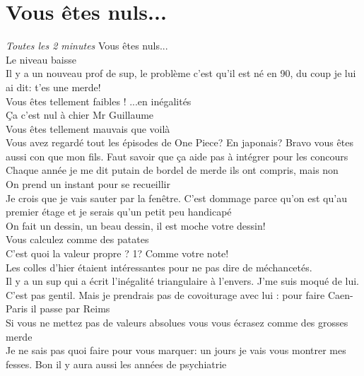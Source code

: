 \documentclass[french, a4paper, openany]{book}
\begin{document}
 \maketitle

\tableofcontents

\section{Vous êtes nuls...}
	
	\noindent \emph{Toutes les 2 minutes} \og Vous êtes nuls... \fg \\
	\og Le niveau baisse \fg \\
	\og Il y a un nouveau prof de sup, le problème c'est qu'il est né en 90, du coup je lui ai dit: t'es une merde! \fg \\
	\og Vous êtes tellement faibles ! ...en inégalités \fg \\
	\og Ça c'est nul à chier Mr Guillaume \fg \\
	\og Vous êtes tellement mauvais que voilà \fg \\
	\og Vous avez regardé tout les épisodes de One Piece? En japonais? Bravo vous êtes aussi con que mon fils. Faut savoir que ça aide pas à intégrer pour les concours \fg \\
	\og Chaque année je me dit \fg putain de bordel de merde ils ont compris\og , mais non \fg \\
	\og On prend un instant pour se recueillir \fg \\
	\og Je crois que je vais sauter par la fenêtre. C'est dommage parce qu'on est qu'au premier étage et je serais qu'un petit peu handicapé \fg \\
	\og On fait un dessin, un beau dessin, il est moche votre dessin! \fg \\
	\og Vous calculez comme des patates \fg \\
	\og C'est quoi la valeur propre ? 1? Comme votre note! \fg \\
	\og Les colles d'hier étaient intéressantes pour ne pas dire de méchancetés. \fg \\
	\og Il y a un sup qui a écrit l'inégalité triangulaire à l'envers. J'me suis moqué de lui. C'est pas gentil. Mais je prendrais pas de covoiturage avec lui : pour faire Caen-Paris il passe par Reims \fg \\
	\og Si vous ne mettez pas de valeurs absolues vous vous écrasez comme des grosses merde \fg \\
	\og Je ne sais pas quoi faire pour vous marquer: un jours je vais vous montrer mes fesses. Bon il y aura aussi les années de psychiatrie \fg \\
\end{document}

